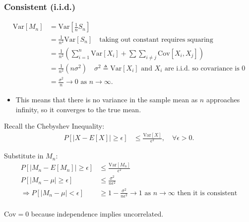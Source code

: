 \subsubsection{Consistent (i.i.d.)}
\begin{derivation}
    \begin{align*}
        \text{Var}[M_n] &= \text{Var}\left[\frac{1}{n} S_n\right] \\
        &= \frac{1}{n^2} \text{Var}[S_n] \quad \text{taking out constant requires squaring}\\
        &= \frac{1}{n^2} \left(\sum_{i=1}^n \text{Var}[X_i] + \sum \sum_{i \neq j} \text{Cov}[X_i, X_j]\right) \\
        &= \frac{1}{n^2} (n \sigma^2) \quad \sigma^2 \triangleq \text{Var}[X_i] \text{ and $X_i$ are i.i.d. so covariance is 0} \\
        &= \frac{\sigma^2}{n} \to 0 \text{ as } n \to \infty.
    \end{align*}
    \begin{itemize}
        \item This means that there is no variance in the sample mean as $n$ approaches infinity, so it converges to the true mean.
    \end{itemize}
    \vspace{1em}

    Recall the Chebyshev Inequality:
    \begin{align*}
        P\left[|X - E[X]| \geq \epsilon\right] &\leq \frac{\text{Var}[X]}{\epsilon^2}, \quad \forall \epsilon > 0.
    \end{align*}

    Substitute in $M_n$:
    \begin{align*}
        P\left[|M_n - E[M_n]| \geq \epsilon\right] &\leq \frac{\text{Var}[M_n]}{\epsilon^2} \\
        P\left[|M_n - \mu| \geq \epsilon\right] &\leq \frac{\sigma^2}{n \epsilon^2} \\
        \Rightarrow P\left[|M_n - \mu| < \epsilon\right] &\geq 1 - \frac{\sigma^2}{n \epsilon^2} \to 1 \text{ as } n \to \infty \text{ then it is consistent} \\
    \end{align*}
\end{derivation}

\begin{warning}
    $\text{Cov} = 0$ because independence implies uncorrelated. 
\end{warning}

